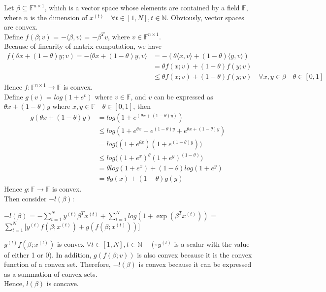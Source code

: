 \documentclass[12pt]{article}
\begin{document}
\begin {enumerate}
\begin {enumerate}
\begin {flushleft}
						Let $\beta \subseteq \mathbb{F}^{n \times 1}$, which is a vector space whose elements 
						are contained by a field $\mathbb{F}$, where $n$ is the dimension of 
						$x^{(t)} \quad \forall t \in [1, N], t \in \mathbb{N}$. Obviously, vector spaces are convex. \\
						Define $f(\beta; v)$ = $- \langle \beta, v \rangle$ = $-\beta^Tv$, 
						where $v \in \mathbb{F}^{n \times 1}$. \\
						Because of linearity of matrix computation, we have \\
						\begin {align*}
							f(\theta x + (1-\theta)y; v) = -\langle \theta x + (1-\theta)y, v \rangle
							& = -(\theta \langle x, v \rangle + (1-\theta) \langle y, v \rangle) \\
							& = \theta f(x; v) + (1-\theta) f(y; v) \\
							& \leq \theta f(x; v) + (1-\theta) f(y; v) \quad \forall x, y \in \beta \quad \theta \in [0, 1]
						\end {align*}
						Hence $f: \mathbb{F}^{n \times 1} \to \mathbb{F}$ is convex. \\
						Define $g(v)$ = $log(1+e^v)$ where $v \in \mathbb{F}$, and $v$ can be expressed as 
						$\theta x + (1-\theta)y$ where $x, y \in \mathbb{F} \quad \theta \in [0, 1]$, then
						\begin{align*}
							g(\theta x + (1-\theta)y)
							& = log(1+e^{ (\theta x + (1-\theta)y) }) \\
							& \leq log (1 + e^{\theta x} + e^{(1-\theta)y} + e^{\theta x + (1-\theta)y}) \\
							& = log \big( (1 + e^{\theta x})(1 + e^{(1-\theta)y}) \big) \\
							& \leq log \big( (1 + e^x)^\theta (1 + e^y)^{(1-\theta)} \big) \\
							& = \theta log(1 + e^x) + (1-\theta) log(1 + e^y) \\
							& = \theta g(x) + (1-\theta) g(y)
						\end{align*}
						Hence $g: \mathbb{F} \to \mathbb{F}$ is convex. \\
						Then consider $-l(\beta)$:
						\begin {center}
							$-l(\beta)$ = $-\displaystyle\sum_{t=1}^N y^{(t)} \beta^T x^{(t)}  +
								\displaystyle\sum_{t=1}^N log( 1 + \exp{ ( \beta^T x^{(t)} ) } )$ 
								= $\displaystyle\sum_{t=1}^N \bigg[ y^{(t)} f(\beta; x^{(t)}) + g(f(\beta; x^{(t)})) \bigg]$
						\end {center}
						$y^{(t)} f(\beta; x^{(t)})$ is convex $\forall t \in [1, N], t \in \mathbb{N} \quad$
						($\because y^{(t)}$ is a scalar with the value of either 1 or 0). 
						In addition, $g(f(\beta; v))$ is also convex because it is 
						the convex function of a convex set. Therefore, $-l(\beta)$ is convex because it can be expressed 
						as a summation of convex sets. \\
						Hence, $l(\beta)$ is concave.
					

\end{flushleft}
\end{enumerate}
\end{enumerate}
\end{document}

